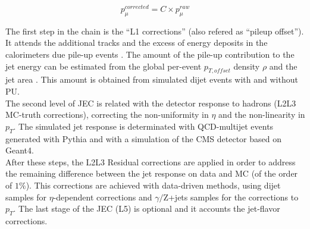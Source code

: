 \begin{equation}
 p_{\mu}^{corrected} = C \times p_{\mu}^{raw}
\end{equation}

The first step in the chain is the ``L1 corrections'' (also refered as ``pileup offset''). It attends the additional tracks and the excess of energy deposits 
in the calorimeters due pile-up events . The amount of the pile-up contribution 
to the jet energy can be estimated from the global per-event $p_{T,offset}$ density $\rho$ and the jet area \cite{JECpileup}. This amount 
is obtained from simulated dijet events with and without PU. \\

The second level of JEC is related with the detector response to hadrons (L2L3 MC-truth corrections), correcting 
the non-uniformity in $\eta$ and the non-linearity in $p_{T}$. The simulated jet response is determinated
with QCD-multijet events generated with Pythia and with a simulation of the CMS detector based
on Geant4.\\

After these steps, the L2L3 Residual corrections are applied in order to address the remaining difference 
between the jet response on data and MC (of the order of $1 \%$). This corrections are achieved with data-driven methods, using 
dijet samples for $\eta$-dependent corrections and $\gamma /$Z+jets samples for the corrections to $p_{T}$. The last stage 
of the JEC (L5) is optional and it accounts the jet-flavor corrections. \\











